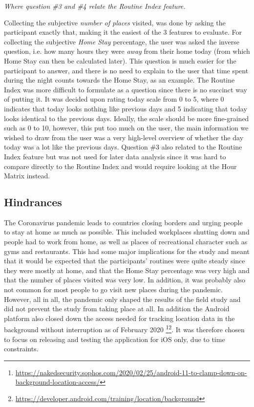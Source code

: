 \textit{Where question \#3 and \#4 relate the Routine Index feature.}

Collecting the subjective \textit{number of places} visited, was done by asking the participant exactly that, making it the easiest of the 3 features to evaluate. For collecting the subjective \textit{Home Stay} percentage, the user was asked the inverse question, i.e. how many hours they were \textit{away} from their home today (from which Home Stay can then be calculated later). This question is much easier for the participant to answer, and there is no need to explain to the user that time spent during the night counts towards the Home Stay, as an example. The Routine Index was more difficult to formulate as a question since there is no succinct way of putting it. It was decided upon rating today scale from 0 to 5, where 0 indicates that today looks nothing like previous days and 5 indicating that today looks identical to the previous days. Ideally, the scale should be more fine-grained such as 0 to 10, however, this put too much on the user, the main information we wished to draw from the user was a very high-level overview of whether the day today was a lot like the previous days. Question \#3 also related to the Routine Index feature but was not used for later data analysis since it was hard to compare directly to the Routine Index and would require looking at the Hour Matrix instead.


\subsection{Hindrances}
The Coronavirus pandemic leads to countries closing borders and urging people to stay at home as much as possible. This included workplaces shutting down and people had to work from home, as well as places of recreational character such as gyms and restaurants. This had some major implications for the study and meant that it would be expected that the participants' routines were quite steady since they were mostly at home, and that the Home Stay percentage was very high and that the number of places visited was very low. In addition, it was probably also not common for most people to go visit new places during the pandemic. However, all in all, the pandemic only shaped the results of the field study and did not prevent the study from taking place at all. In addition the Android platform also closed down the access needed for tracking location data in the background without interruption as of February 2020 \footnote{\url{https://nakedsecurity.sophos.com/2020/02/25/android-11-to-clamp-down-on-background-location-access/}}\footnote{\url{https://developer.android.com/training/location/background}}. It was therefore chosen to focus on releasing and testing the application for iOS only, due to time constraints.


